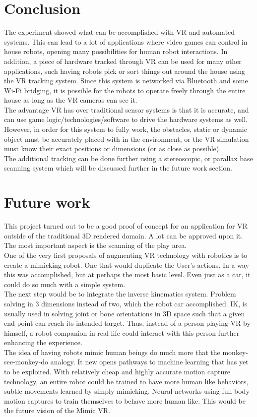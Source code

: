\documentclass[10pt,a4paper]{article}
\begin{document}
	\section*{Conclusion}
	The experiment showed what can be accomplished with VR and automated systems. This can lead to a lot of applications where video games can control in house robots, opening many possibilities for human robot interactions. In addition, a piece of hardware tracked through VR can be used for many other applications, such having robots pick or sort things out around the house using the VR tracking system. Since this system is networked via Bluetooth and some Wi-Fi bridging, it is possible for the robots to operate freely through the entire house as long as the VR cameras can see it.
	\\
	The advantage VR has over traditional sensor systems is that it is accurate, and can use game logic/technologies/software to drive the hardware systems as well. However, in order for this system to fully work, the obstacles, static or dynamic object must be accurately placed with in the environment, or the VR simulation must know their exact positions or dimensions (or as close as possible).
	\\
	The additional tracking can be done further using a stereoscopic, or parallax base scanning system which will be discussed further in the future work section.
	
	\section*{Future work}
	This project turned out to be a good proof of concept for an application for VR outside of the traditional 3D rendered domain. A lot can be approved upon it. The most important aspect is the scanning of the play area. 
	\\
	One of the very first proposals of augmenting VR technology with robotics is to create a mimicking robot. One that would duplicate the User's actions. In a way this was accomplished, but at perhaps the most basic level. Even just as a car, it could do so much with a simple system.
	\\
	The next step would be to integrate the inverse kinematics system. Problem solving in 3 dimensions instead of two, which the robot car accomplished. IK, is usually used in solving joint or bone orientations in 3D space such that a given end point can reach its intended target. Thus, instead of a person playing VR by himself, a robot companion in real life could interact with this person further enhancing the experience.
	\\
	The idea of having robots mimic human beings do much more that the monkey-see-monkey-do analogy. It new opens pathways to machine learning that has yet to be exploited. With relatively cheap and highly accurate motion capture technology, an entire robot could be trained to have more human like behaviors, subtle movements learned by simply mimicking. Neural networks using full body motion captures to train themselves to behave more human like. This would be the future vision of the Mimic VR.
	
\end{document}
